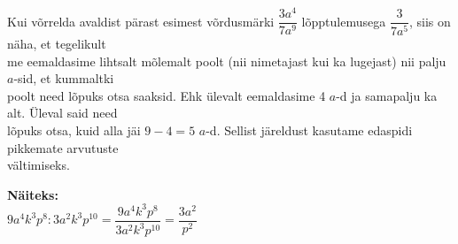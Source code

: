 \begin{center}
{{{\begin{flushleft}
\vspace{2mm} 
\hspace{5mm}
Kui võrrelda avaldist pärast esimest võrdusmärki $\dfrac{3a^{4}}{7a^{9}}$ lõpptulemusega $\dfrac{3}{7 a^{5}}$, siis on näha, et tegelikult\\ \hspace{5mm} me eemaldasime lihtsalt mõlemalt poolt (nii nimetajast kui ka lugejast) nii palju $a$-sid, et kummaltki\\ \hspace{5mm} poolt need lõpuks otsa saaksid. Ehk ülevalt eemaldasime 4 $a$-d ja samapalju ka alt. Üleval said need\\ \hspace{5mm} lõpuks otsa, kuid alla jäi $9-4=5$ $a$-d. Sellist järeldust kasutame edaspidi pikkemate arvutuste\\ \hspace{5mm} vältimiseks.

\vspace{2mm}
\hspace{5mm}
\textbf{Näiteks:}\\
\hspace{5mm}
$9a^{4}k^{3}p^{8}:3a^{2}k^{3}p^{10}=\dfrac{9a^{4}k^{3}p^{8}}{3a^{2}k^{3}p^{10}}=\dfrac{3a^{2}}{p^{2}}$
\end{flushleft}
}}}
\end{center}


\pagebreak

